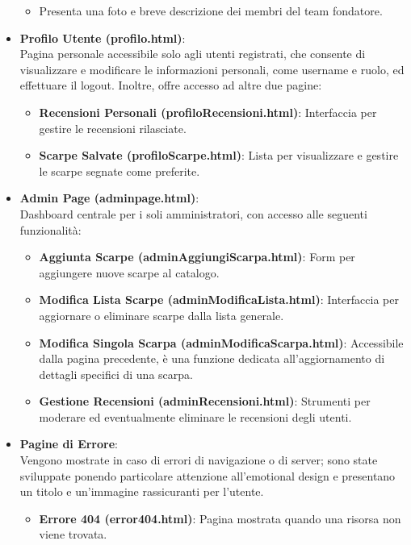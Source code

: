 \documentclass[a4paper, 12pt]{article}
\begin{document}
\begin{justify}
\begin{itemize}
\begin{itemize}
            \item Presenta una foto e breve descrizione dei membri del team fondatore.
        \end{itemize}
    \item \textbf{Profilo Utente (profilo.html)}:\\ 
    Pagina personale accessibile solo agli utenti registrati, che consente di visualizzare e modificare le informazioni personali, come username e ruolo, ed effettuare il logout. Inoltre, offre accesso ad altre due pagine:
        \begin{itemize}
            \item \textbf{Recensioni Personali (profiloRecensioni.html)}: Interfaccia per gestire le recensioni rilasciate.
            \item \textbf{Scarpe Salvate (profiloScarpe.html)}: Lista per visualizzare e gestire le scarpe segnate come preferite.
        \end{itemize}
    \item \textbf{Admin Page (adminpage.html)}:\\ 
    Dashboard centrale per i soli amministratori, con accesso alle seguenti funzionalità:
        \begin{itemize}
            \item \textbf{Aggiunta Scarpe (adminAggiungiScarpa.html)}: Form per aggiungere nuove scarpe al catalogo.
            \item \textbf{Modifica Lista Scarpe (adminModificaLista.html)}: Interfaccia per aggiornare o eliminare scarpe dalla lista generale.
            \item \textbf{Modifica Singola Scarpa (adminModificaScarpa.html)}: Accessibile dalla pagina precedente, è una funzione dedicata all'aggiornamento di dettagli specifici di una scarpa.
            \item \textbf{Gestione Recensioni (adminRecensioni.html)}: Strumenti per moderare ed eventualmente eliminare le recensioni degli utenti.
        \end{itemize}
    \item \textbf{Pagine di Errore}:\\
    Vengono mostrate in caso di errori di navigazione o di server; sono state sviluppate ponendo particolare attenzione all'emotional design e presentano un titolo e un'immagine rassicuranti per l'utente.
        \begin{itemize}
            \item \textbf{Errore 404 (error404.html)}: Pagina mostrata quando una risorsa non viene trovata.

\end{itemize}
\end{itemize}
\end{justify}
\end{document}
